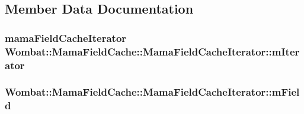 \subsection{Member Data Documentation}
\hypertarget{classWombat_1_1MamaFieldCache_1_1MamaFieldCacheIterator_a75827ac60afb7271d94de5abf683231e}{
\subsubsection[{mIterator}]{\setlength{\rightskip}{0pt plus 5cm}mamaFieldCacheIterator {\bf Wombat::MamaFieldCache::MamaFieldCacheIterator::mIterator}}}
\label{classWombat_1_1MamaFieldCache_1_1MamaFieldCacheIterator_a75827ac60afb7271d94de5abf683231e}
\hypertarget{classWombat_1_1MamaFieldCache_1_1MamaFieldCacheIterator_a4c148281e6266bf04c230fc8a488f0fb}{
\subsubsection[{mField}]{ {\bf Wombat::MamaFieldCache::MamaFieldCacheIterator::mField}}}
\label{classWombat_1_1MamaFieldCache_1_1MamaFieldCacheIterator_a4c148281e6266bf04c230fc8a488f0fb}
